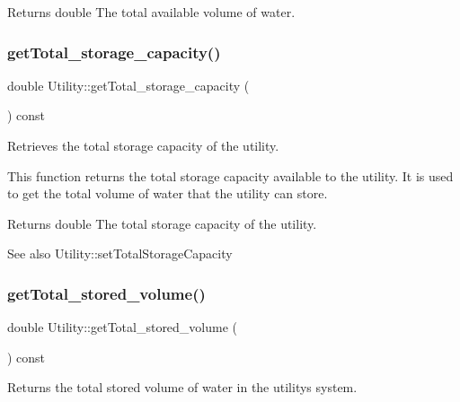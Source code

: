 \begin{DoxyReturn}{Returns}
double The total available volume of water. 
\end{DoxyReturn}
\mbox{\label{classUtility_a16f8269dc5f80c1d079c49f33495f620}} 
\subsubsection{\texorpdfstring{get\+Total\+\_\+storage\+\_\+capacity()}{getTotal\_storage\_capacity()}}
{\footnotesize\ttfamily double Utility\+::get\+Total\+\_\+storage\+\_\+capacity (\begin{DoxyParamCaption}{ }\end{DoxyParamCaption}) const}



Retrieves the total storage capacity of the utility. 

This function returns the total storage capacity available to the utility. It is used to get the total volume of water that the utility can store. \begin{DoxyReturn}{Returns}
double The total storage capacity of the utility.
\end{DoxyReturn}
\begin{DoxySeeAlso}{See also}
Utility\+::set\+Total\+Storage\+Capacity 
\end{DoxySeeAlso}
\mbox{\label{classUtility_a5d932aef9e201e824ac681cd6928613a}} 
\subsubsection{\texorpdfstring{get\+Total\+\_\+stored\+\_\+volume()}{getTotal\_stored\_volume()}}
{\footnotesize\ttfamily double Utility\+::get\+Total\+\_\+stored\+\_\+volume (\begin{DoxyParamCaption}{ }\end{DoxyParamCaption}) const}



Returns the total stored volume of water in the utility\textquotesingle{}s system. 

